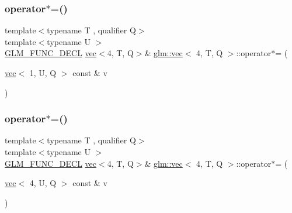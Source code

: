 \mbox{\label{structglm_1_1vec_3_014_00_01_t_00_01_q_01_4_a4b89052935e5383d7b04478b91a25823}} 
\subsubsection{\texorpdfstring{operator$\ast$=()}{operator*=()}\hspace{0.1cm}{\footnotesize\ttfamily [2/6]}}
{\footnotesize\ttfamily template$<$typename T , qualifier Q$>$ \\
template$<$typename U $>$ \\
\mbox{\hyperlink{setup_8hpp_ab2d052de21a70539923e9bcbf6e83a51}{G\+L\+M\+\_\+\+F\+U\+N\+C\+\_\+\+D\+E\+CL}} \mbox{\hyperlink{structglm_1_1vec}{vec}}$<$4, T, Q$>$\& \mbox{\hyperlink{structglm_1_1vec}{glm\+::vec}}$<$ 4, T, Q $>$\+::operator$\ast$= (\begin{DoxyParamCaption}\item[{\mbox{\hyperlink{structglm_1_1vec}{vec}}$<$ 1, U, Q $>$ const \&}]{v }\end{DoxyParamCaption})}

\mbox{\label{structglm_1_1vec_3_014_00_01_t_00_01_q_01_4_a27ac62ee4c5d423e772c40d015ee54da}} 
\subsubsection{\texorpdfstring{operator$\ast$=()}{operator*=()}\hspace{0.1cm}{\footnotesize\ttfamily [3/6]}}
{\footnotesize\ttfamily template$<$typename T , qualifier Q$>$ \\
template$<$typename U $>$ \\
\mbox{\hyperlink{setup_8hpp_ab2d052de21a70539923e9bcbf6e83a51}{G\+L\+M\+\_\+\+F\+U\+N\+C\+\_\+\+D\+E\+CL}} \mbox{\hyperlink{structglm_1_1vec}{vec}}$<$4, T, Q$>$\& \mbox{\hyperlink{structglm_1_1vec}{glm\+::vec}}$<$ 4, T, Q $>$\+::operator$\ast$= (\begin{DoxyParamCaption}\item[{\mbox{\hyperlink{structglm_1_1vec}{vec}}$<$ 4, U, Q $>$ const \&}]{v }\end{DoxyParamCaption})}

